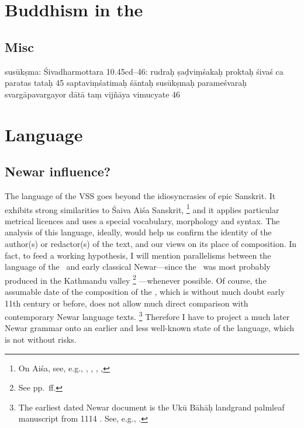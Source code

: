 \section{Buddhism in the \VSS}


\subsection{Misc}

  susūkṣma: Śivadharmottara 10.45cd--46: rudraḥ ṣaḍviṃśakaḥ proktaḥ
  śivaś ca paratas tataḥ \textbar{}\textbar{} 45 \textbar{}\textbar{}
  saptaviṃśatimaḥ śāntaḥ susūkṣmaḥ parameśvaraḥ \textbar{}
  svargāpavargayor dātā taṃ vijñāya vimucyate \textbar{}\textbar{} 
  46
  







\section{Language}

\subsection{Newar influence?}
\label{newar}

The language of the VSS goes beyond the idiosyncrasies of epic Sanskrit.
It exhibits strong similarities to Śaiva Aiśa Sanskrit,%
		\footnote{On Aiśa, see, e.g., , 
								  ,
						          , 
						          , 
						          } 
and it applies particular metrical licences and 
uses a special vocabulary, morphology and syntax.
The analysis of this language, ideally, would help us
confirm the identity of the author(s) or redactor(s) of the text, 
and our views on its place of composition. In fact, 
to feed a working hypothesis, I will mention parallelisms
between the language of the \VSS\ and early classical 
Newar---since the \VSS\ was most probably produced in the 
Kathmandu valley%
		\footnote{See pp.~\pageref{provenance}\thinspace ff.}%
---whenever possible. 
Of course, the assumable date
of the composition of the \VSS, which is without much doubt
early 11th century or before, does not allow much direct 
comparison with contemporary Newar language texts.%
	\footnote{The earliest dated Newar document is 
			the Ukū Bāhāḥ landgrand palmleaf manuscript from
			1114 \CE. See, e.g., .}
Therefore I have to project a much later Newar grammar
onto an earlier and less well-known 
state of the language, which is not without risks.

